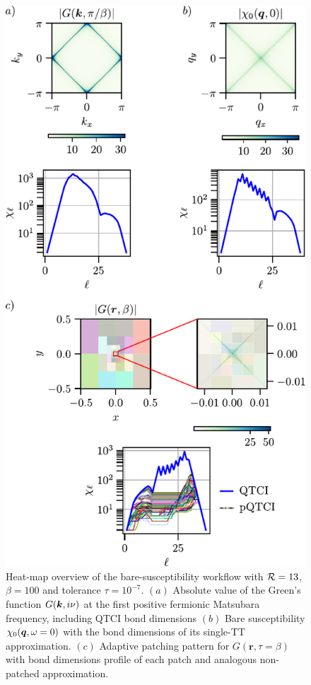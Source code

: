 \begin{figure}[htpb]
    \centering 
    \includegraphics{figures/heatmapBubble.pdf}
    \caption{Heat-map overview of the bare-susceptibility workflow with $\mathcal{R}=13$, $\beta=100$ and tolerance $\tau=10^{-7}$.
    $(a)$ Absolute value of the Green’s function $G(\boldsymbol{k},i\nu)$ at the first positive fermionic Matsubara frequency, including QTCI bond dimensions 
    $(b)$ Bare susceptibility \(\chi_{0}(\boldsymbol{q},\omega=0)\) with the bond dimensions of its single-TT approximation. 
    $(c)$ Adaptive patching pattern for \(G(\mathbf r,\tau=\beta)\) with bond dimensions profile of each patch and analogous non-patched approximation.}
    \label{fig:heatmapBubble}
\end{figure}

